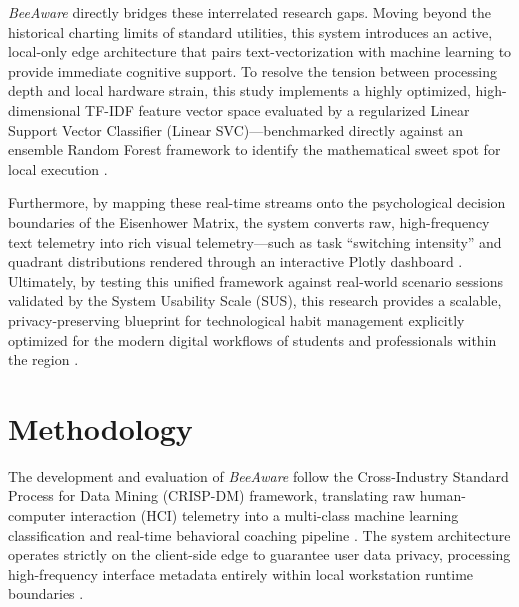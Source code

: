 \documentclass[conference]{IEEEtran}
\begin{document}
\emph{BeeAware} directly bridges these interrelated research gaps. Moving beyond the historical charting limits of standard utilities, this system introduces an active, local-only edge architecture that pairs text-vectorization with machine learning to provide immediate cognitive support. To resolve the tension between processing depth and local hardware strain, this study implements a highly optimized, high-dimensional TF-IDF feature vector space evaluated by a regularized Linear Support Vector Classifier (Linear SVC)—benchmarked directly against an ensemble Random Forest framework to identify the mathematical sweet spot for local execution \cite{Cahyani2021, Khan2022}. 

Furthermore, by mapping these real-time streams onto the psychological decision boundaries of the Eisenhower Matrix, the system converts raw, high-frequency text telemetry into rich visual telemetry—such as task ``switching intensity'' and quadrant distributions rendered through an interactive Plotly dashboard \cite{Covey1989, Zhu2018, Narechania2021}. Ultimately, by testing this unified framework against real-world scenario sessions validated by the System Usability Scale (SUS), this research provides a scalable, privacy-preserving blueprint for technological habit management explicitly optimized for the modern digital workflows of students and professionals within the region \cite{Bangor2008, Sauro2016}.

\section{Methodology}
The development and evaluation of \emph{BeeAware} follow the Cross-Industry Standard Process for Data Mining (CRISP-DM) framework, translating raw human-computer interaction (HCI) telemetry into a multi-class machine learning classification and real-time behavioral coaching pipeline \cite{Abhari2022}. The system architecture operates strictly on the client-side edge to guarantee user data privacy, processing high-frequency interface metadata entirely within local workstation runtime boundaries \cite{Salice2024}.
\end{document}
